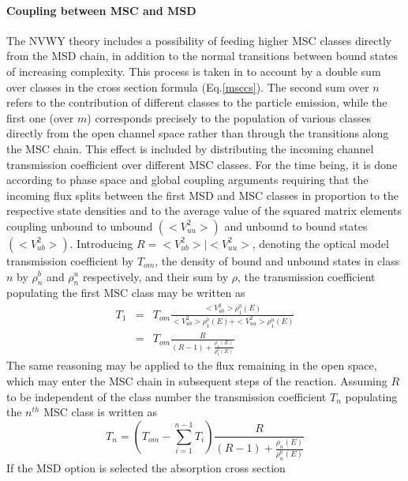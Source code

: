 \documentclass[twocolumn,amsmath,amssymb,10pt,groupedaddress,a4paper]{revtex4}
\begin{document}
\paragraph{Coupling between MSC and MSD}
The NVWY theory includes a possibility of feeding higher
MSC classes directly from the MSD chain, in addition to
the normal transitions between bound states of increasing complexity.
This process is taken in to account by a double sum over classes in
the cross section formula (Eq.\ref{msccs}). The second sum over $n$
refers to the contribution of different classes to the particle emission,
while the first one (over $m$) corresponds precisely to the population
of various classes directly from the open channel space rather than
through the transitions along the MSC chain. This effect is included
by distributing the incoming channel transmission
coefficient over different MSC classes. For the time being,
it is done according to phase space and global coupling arguments
requiring that the incoming flux splits between the first MSD
and MSC classes in proportion to the respective state densities and
to the average value of the squared matrix elements coupling unbound
to unbound $(<V_{uu}^{2}>)$ and unbound to bound states $(<V_{ub}^{2}>)$.
Introducing $R=<V_{ub}^{2}>\mid<V_{uu}^{2}>$, denoting the optical
model transmission coefficient by $T_{om}$, the density of bound
and unbound states in class $n$ by $\rho_{n}^{b}$ and $\rho_{n}^{u}$
respectively, and their sum by $\rho$, the transmission coefficient
populating the first MSC class may be written as
\begin{eqnarray}
T_{1}&=&T_{om}\frac{<V_{ub}^{2}>\rho_{1}^{b}(E)}{<V_{ub}^{2}>\rho_{1}^{b}(E)+<V_{uu}^{2}>\rho_{1}^{u}(E)}\nonumber\\
&=&T_{om}\frac{R}{(R-1)+\frac{\rho_{1}(E)}{\rho_{1}^{b}(E)}}\label{eq9}
\end{eqnarray}
The same reasoning may be applied to the flux remaining in the open
space, which may enter the MSC chain in subsequent steps
of the reaction. Assuming $R$ to be independent of the class number
the transmission coefficient $T_{n}$ populating the $n^{th}$ MSC
class is written as
\begin{equation}
T_{n}=\left(T_{om}-\sum_{i=1}^{n-1}T_{i}\right)\frac{R}{(R-1)+\frac{\rho_{n}(E)}{\rho_{n}^{b}(E)}}\label{eq10}\end{equation}
If the MSD option is selected the absorption cross section
\end{document}
